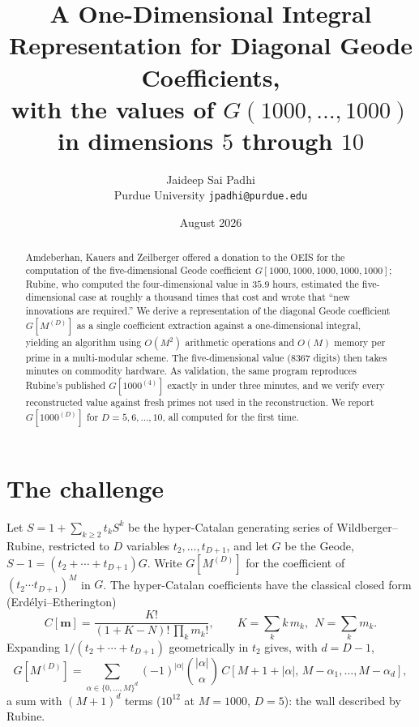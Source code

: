 \documentclass[11pt]{article}
\title{A One-Dimensional Integral Representation for Diagonal Geode Coefficients,\\
with the values of $G(1000,\dots,1000)$ in dimensions $5$ through $10$}
\author{Jaideep Sai Padhi\\ \small Purdue University \quad \texttt{jpadhi@purdue.edu}}
\date{August 2026}
\begin{document}
\maketitle
\begin{abstract}
Amdeberhan, Kauers and Zeilberger offered a donation to the OEIS for the computation of the
five-dimensional Geode coefficient $G[1000,1000,1000,1000,1000]$; Rubine, who computed the
four-dimensional value in $35.9$ hours, estimated the five-dimensional case at roughly a
thousand times that cost and wrote that ``new innovations are required.'' We derive a
representation of the diagonal Geode coefficient $G[M^{(D)}]$ as a single coefficient
extraction against a one-dimensional integral, yielding an algorithm using $O(M^2)$ arithmetic
operations and $O(M)$ memory per prime in a multi-modular scheme. The five-dimensional value
(8367 digits) then takes minutes on commodity hardware. As validation, the same program
reproduces Rubine's published $G[1000^{(4)}]$ exactly in under three minutes, and we verify
every reconstructed value against fresh primes not used in the reconstruction. We report
$G[1000^{(D)}]$ for $D=5,6,\dots,10$, all computed for the first time.
\end{abstract}

\section{The challenge}
Let $S=1+\sum_{k\ge 2}t_kS^k$ be the hyper-Catalan generating series of Wildberger--Rubine,
restricted to $D$ variables $t_2,\dots,t_{D+1}$, and let $G$ be the Geode,
$S-1=(t_2+\cdots+t_{D+1})G$. Write $G[M^{(D)}]$ for the coefficient of
$(t_2\cdots t_{D+1})^M$ in $G$. The hyper-Catalan coefficients have the classical closed form
(Erd\'elyi--Etherington)
\[ C[\mathbf m]=\frac{K!}{(1+K-N)!\,\prod_k m_k!},\qquad K=\sum_k k\,m_k,\ \ N=\sum_k m_k. \]
Expanding $1/(t_2+\cdots+t_{D+1})$ geometrically in $t_2$ gives, with $d=D-1$,
\begin{equation}\label{eq:alt}
G[M^{(D)}]=\sum_{\alpha\in\{0,\dots,M\}^{d}}(-1)^{|\alpha|}\binom{|\alpha|}{\alpha}\,
C\!\left[M{+}1{+}|\alpha|,\,M{-}\alpha_1,\dots,M{-}\alpha_d\right],
\end{equation}
a sum with $(M{+}1)^d$ terms ($10^{12}$ at $M=1000$, $D=5$): the wall described by Rubine.
\end{document}
